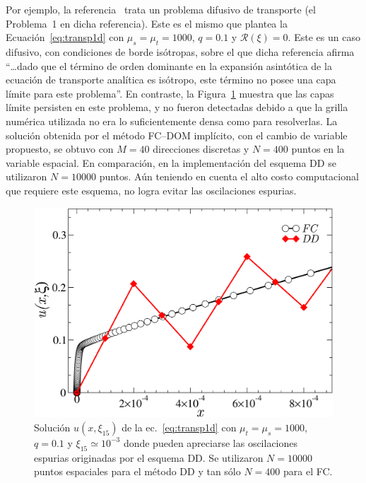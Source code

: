 Por ejemplo, la referencia~\cite{Larsen1987} trata un problema 
difusivo de transporte (el Problema~1 en dicha referencia). 
Este es el mismo que plantea la Ecuación~\eqref{eq:transp1d} con $\mu_s=\mu_t=1000$,
 $q=0.1$ y $\mathcal{R}(\xi)=0$. Este es un caso  
 difusivo, con condiciones de borde isótropas, 
 sobre el que dicha referencia afirma~\cite[pp. 317]{Larsen1987} 
 ``\ldots dado que el término de orden dominante en la expansión asintótica 
 de la ecuación de transporte analítica es isótropo, 
 este término no posee una capa límite para este problema''. 
 En contraste, la Figura~\ref{fig:DDlayer} muestra que 
 las capas límite persisten en este problema, y 
 no fueron detectadas debido a que la grilla numérica utilizada 
 no era lo suficientemente densa como para resolverlas. 
 La solución obtenida por el método FC--DOM implícito,  
 con el cambio de variable propuesto, se obtuvo 
 con $M=40$ direcciones discretas y $N=400$ puntos 
 en la variable espacial. En comparación, en la implementación del esquema DD 
 se utilizaron $N=10000$ puntos. Aún teniendo en cuenta 
 el alto costo computacional que requiere este esquema, no logra 
 evitar las oscilaciones espurias.
\begin{figure}[h!]
\centering
  \includegraphics[width=0.5\linewidth]{figuras/layerlar.pdf}
  \caption{Solución $u(x,\xi_{15})$ de la ec.~\eqref{eq:transp1d} 
  con $\mu_t=\mu_s=1000$, $q=0.1$ y $\xi_{\text{15}} \simeq 10^{-3}$
  donde pueden apreciarse las oscilaciones espurias originadas 
  por el esquema DD. Se utilizaron $N=10000$ puntos espaciales para el método DD y 
  tan sólo $N=400$ para el FC.}
 \label{fig:DDlayer}
\end{figure}

